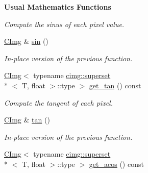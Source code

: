 \begin{Indent}{\bf Usual Mathematics Functions}
\begin{DoxyCompactItemize}
\begin{DoxyCompactList}\small\item\em Compute the sinus of each pixel value. \end{DoxyCompactList}\item 
\hypertarget{structcimg__library_1_1_c_img_a9c15b23160795b53834a54e0d72d13cd}{\hyperlink{structcimg__library_1_1_c_img}{C\-Img} \& \hyperlink{structcimg__library_1_1_c_img_a9c15b23160795b53834a54e0d72d13cd}{sin} ()}\label{structcimg__library_1_1_c_img_a9c15b23160795b53834a54e0d72d13cd}

\begin{DoxyCompactList}\small\item\em In-\/place version of the previous function. \end{DoxyCompactList}\item 
\hypertarget{structcimg__library_1_1_c_img_a326054d02efec9da87e6777bc488a2cf}{\hyperlink{structcimg__library_1_1_c_img}{C\-Img}$<$ typename \hyperlink{structcimg__library_1_1cimg_1_1superset}{cimg\-::superset}\\*
$<$ T, float $>$\-::type $>$ \hyperlink{structcimg__library_1_1_c_img_a326054d02efec9da87e6777bc488a2cf}{get\-\_\-tan} () const }\label{structcimg__library_1_1_c_img_a326054d02efec9da87e6777bc488a2cf}

\begin{DoxyCompactList}\small\item\em Compute the tangent of each pixel. \end{DoxyCompactList}\item 
\hypertarget{structcimg__library_1_1_c_img_aa898115ad56312c0dd33409bf559d69b}{\hyperlink{structcimg__library_1_1_c_img}{C\-Img} \& \hyperlink{structcimg__library_1_1_c_img_aa898115ad56312c0dd33409bf559d69b}{tan} ()}\label{structcimg__library_1_1_c_img_aa898115ad56312c0dd33409bf559d69b}

\begin{DoxyCompactList}\small\item\em In-\/place version of the previous function. \end{DoxyCompactList}\item 
\hypertarget{structcimg__library_1_1_c_img_ac7a855c426795c02a002ecb408102b6a}{\hyperlink{structcimg__library_1_1_c_img}{C\-Img}$<$ typename \hyperlink{structcimg__library_1_1cimg_1_1superset}{cimg\-::superset}\\*
$<$ T, float $>$\-::type $>$ \hyperlink{structcimg__library_1_1_c_img_ac7a855c426795c02a002ecb408102b6a}{get\-\_\-acos} () const }\label{structcimg__library_1_1_c_img_ac7a855c426795c02a002ecb408102b6a}


\end{DoxyCompactItemize}
\end{Indent}
